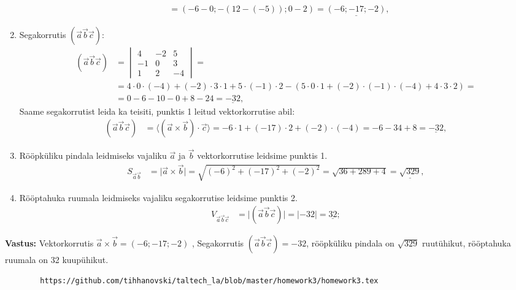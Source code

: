 \documentclass[10pt, a4paper]{article}
\begin{document}
\begin{enumerate}
\begin{align}
                    &= (-6 - 0; -(12 - (-5)); 0 - 2) = \underline{(-6; -17; -2)},
                \end{align}
            \item Segakorrutis $(\vec{a} \vec{b} \vec{c})$:
                \begin{align}
                    \nonumber
                    (\vec{a} \vec{b} \vec{c}) &=
                    \begin{vmatrix}
                        4 & -2 & 5 \\
                        -1 & 0 & 3 \\
                        1 & 2 & -4
                    \end{vmatrix} = \\ \nonumber
                    &= 4 \cdot 0 \cdot (-4) + (-2) \cdot 3 \cdot 1 + 5 \cdot (-1) \cdot 2 - (5 \cdot 0 \cdot 1 + (-2) \cdot (-1) \cdot (-4) + 4 \cdot 3 \cdot 2) = \\ \nonumber
                    &= 0 - 6 - 10 - 0 + 8 - 24 = \underline{-32},
                \end{align}
                Saame segakorrutist leida ka teisiti, punktis 1 leitud vektorkorrutise abil:
                \begin{align}
                    \nonumber
                    (\vec{a} \vec{b} \vec{c}) &= \langle (\vec{a} \times \vec{b}) \cdot \vec{c} \rangle = -6 \cdot 1 + (-17) \cdot 2 + (-2) \cdot (-4) = -6 - 34 + 8 = \underline{-32},
                \end{align}
            \item Rööpküliku pindala leidmiseks vajaliku $\vec{a}$ ja $\vec{b}$ vektorkorrutise leidsime punktis 1.
                \begin{align}
                    \nonumber
                    S_{\vec{a}\vec{b}} &= \lvert \vec{a} \times \vec{b} \rvert = \sqrt{(-6)^2 + (-17)^2 + (-2)^2} = \sqrt{36 + 289 + 4} = \underline{\sqrt{329}},
                \end{align}
            \item Rööptahuka ruumala leidmiseks vajaliku segakorrutise leidsime punktis 2.
                \begin{align}
                    \nonumber
                    V_{\vec{a}\vec{b}\vec{c}} &= \lvert (\vec{a} \vec{b} \vec{c}) \rvert = \lvert -32 \rvert = \underline{32};
                \end{align}
            \end{enumerate}
        \textbf{Vastus: } Vektorkorrutis $\vec{a} \times \vec{b} = (-6; -17; -2)$ , Segakorrutis $(\vec{a} \vec{b} \vec{c}) = -32$, rööpküliku pindala on $\sqrt{329}$ ruutühikut, rööptahuka ruumala on 32 kuupühikut.
    
    \begin{verbatim}
        https://github.com/tihhanovski/taltech_la/blob/master/homework3/homework3.tex
    \end{verbatim}
\end{document}
